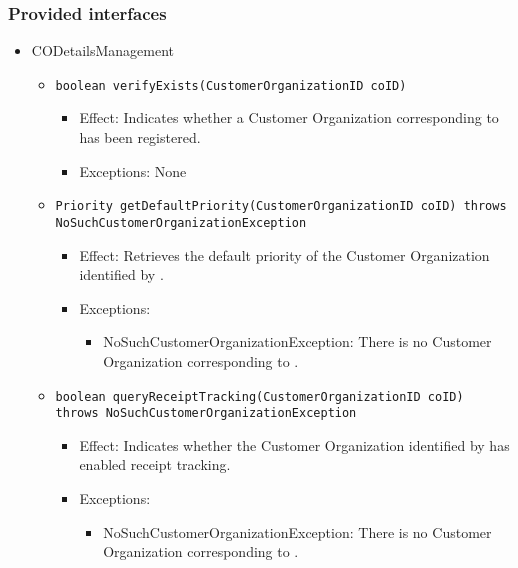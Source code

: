 \subsubsection*{Provided interfaces}
\begin{itemize}
    \item CODetailsManagement
    \begin{itemize}
		\item \texttt{boolean verifyExists(CustomerOrganizationID coID)}
		    \begin{itemize}
                \item Effect: Indicates whether a Customer Organization corresponding to  has been registered.
                \item Exceptions: None
            \end{itemize}

		\item \texttt{Priority getDefaultPriority(CustomerOrganizationID coID) throws NoSuchCustomerOrganizationException}
		    \begin{itemize}
                \item Effect: Retrieves the default priority of the Customer Organization identified by .
                \item Exceptions:
				\begin{itemize}
					\item NoSuchCustomerOrganizationException: There is no Customer Organization corresponding to .
				\end{itemize}
            \end{itemize}

		\item \texttt{boolean queryReceiptTracking(CustomerOrganizationID coID) throws NoSuchCustomerOrganizationException}
		    \begin{itemize}
                \item Effect: Indicates whether the Customer Organization identified by  has enabled receipt tracking.
                \item Exceptions:
				\begin{itemize}
					\item NoSuchCustomerOrganizationException: There is no Customer Organization corresponding to .
				\end{itemize}
            \end{itemize}


\end{itemize}
\end{itemize}
